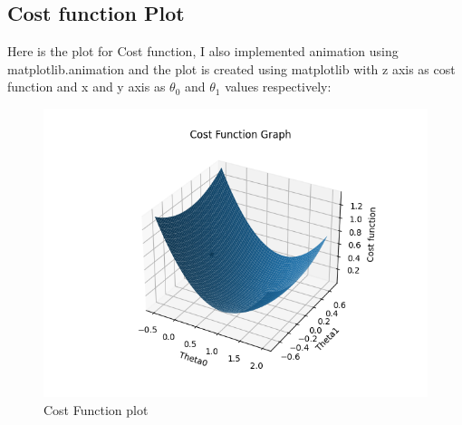 \documentclass[12pt]{article}
\begin{document}
\subsection{Cost function Plot}  Here is the plot for Cost function, I also implemented animation using matplotlib.animation and the plot is created using matplotlib with z axis as cost function and x and y axis as $\theta_0$ and $\theta_1$ values respectively:\\
\begin{figure}[H]
  \includegraphics[width=\linewidth]{costFunctionPlot.png}
  \caption{Cost Function plot}
  \label{fig1B}
\end{figure}
\end{document}
